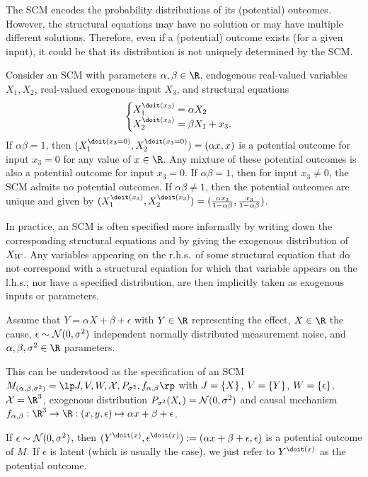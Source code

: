 The SCM encodes the probability distributions of its (potential) outcomes.
However, the structural equations  may have no solution or may have multiple different solutions.
Therefore, even if a (potential) outcome exists (for a given input), it could be that its distribution is not uniquely determined by the SCM.
\begin{Eg}
Consider an SCM with parameters $\alpha,\beta \in \RN$, endogenous real-valued variables $X_1,X_2$, real-valued exogenous input $X_3$, and structural equations
$$\begin{cases}
  X_1^{\doit(x_3)} = \alpha X_2 & \\
  X_2^{\doit(x_3)} = \beta X_1 + x_3. &
\end{cases}$$
  If $\alpha \beta = 1$, then $(X_1^{\doit(x_3=0)},X_2^{\doit(x_3=0)}) = (\alpha x,x)$ is a potential outcome for input $x_3=0$ for any value of $x\in\RN$. Any mixture of these potential outcomes is also a potential outcome for input  $x_3=0$.
  If $\alpha \beta = 1$, then for input $x_3 \ne 0$, the SCM admits no potential outcomes.
  If $\alpha \beta \ne 1$, then the potential outcomes are unique and given by
  $(X_1^{\doit(x_3)},X_2^{\doit(x_3)}) = (\frac{\alpha x_3}{1 - \alpha\beta},\frac{x_3}{1 - \alpha\beta})$.
\end{Eg}

In practice, an SCM is often specified more informally by writing down the corresponding structural
equations and by giving the exogenous distribution of $X_{W}$. 
Any variables appearing
on the r.h.s.\ of some structural equation that do not correspond with a structural equation for which
that variable appears on the l.h.s., nor have a specified distribution, are then implicitly taken as
exogenous inputs or parameters.
\begin{Eg}
  Assume that $Y = \alpha X + \beta + \epsilon$ with $Y \in \RN$ representing the effect, $X \in \RN$
  the cause, $\epsilon \sim \mathcal{N}(0,\sigma^2)$ independent normally distributed measurement noise, and
  $\alpha,\beta,\sigma^2 \in \RN$ parameters.

  This can be understood as the specification of an SCM
  $M_{(\alpha,\beta,\sigma^2)} = \lt \Sin, \Send, \Srnd, \CX, P_{\sigma^2}, f_{\alpha,\beta} \rt$ 
  with $J = \{X\}$, $V = \{Y\}$, $W = \{\epsilon\}$, $\CX = \RN^3$, 
  exogenous distribution $P_{\sigma^2}(X_\epsilon) = \mathcal{N}(0,\sigma^2)$
  and causal mechanism $f_{\alpha,\beta} : \RN^3 \to \RN : (x,y,\epsilon) \mapsto \alpha x + \beta + \epsilon$.

  If $\epsilon \sim \mathcal{N}(0,\sigma^2)$, then $(Y^{\doit(x)},\epsilon^{\doit(x)}) := (\alpha x + \beta + \epsilon, \epsilon)$ is
  a potential outcome of $M$. 
  If $\epsilon$ is latent (which is usually the case), we just refer to $Y^{\doit(x)}$ as the potential outcome.
\end{Eg}

